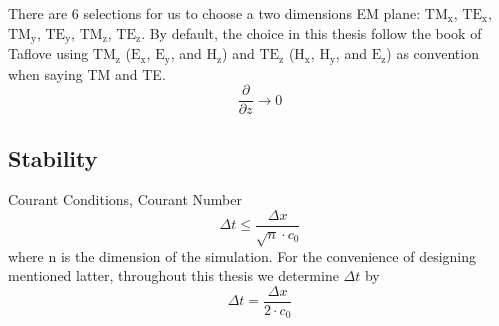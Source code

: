 There are 6 selections for us to choose a two dimensions EM plane: $\mathrm{TM_{x}} $, $\mathrm{TE_{x}}$,
$\mathrm{TM_{y}}$, $\mathrm{TE_{y}}$, $\mathrm{TM_{z}}$, $\mathrm{TE_{z}}$. By default, the choice in this thesis follow
the book of Taflove using $\mathrm{TM_{z}}$ ($\mathrm{E_x}$, $\mathrm{E_y}$, and $\mathrm{H_z}$) and $\mathrm{TE_{z}}$
($\mathrm{H_x}$, $\mathrm{H_y}$, and $\mathrm{E_z}$) as convention when saying TM and TE.
\begin{displaymath}
  \frac{\partial}{\partial z} \rightarrow 0
\end{displaymath}



\subsection{Stability}
Courant Conditions, Courant Number
\begin{equation}
  \Delta t \le \frac{\Delta x}{\sqrt{n}\cdot c_0}
\end{equation}
where n is the dimension of the simulation. For the convenience of designing mentioned latter, throughout this thesis we determine
$\Delta t$ by
\begin{equation}
  \Delta t = \frac{\Delta x}{2 \cdot c_0}
\end{equation}
